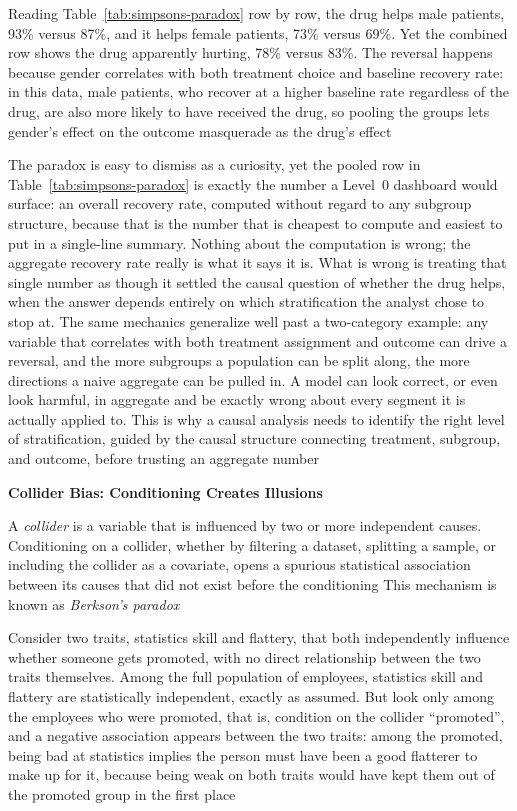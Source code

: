 Reading Table~\ref{tab:simpsons-paradox} row by row, the drug helps male
patients, 93\% versus 87\%, and it helps female patients, 73\% versus 69\%. Yet
the combined row shows the drug apparently hurting, 78\% versus 83\%. The
reversal happens because gender correlates with both treatment choice and
baseline recovery rate: in this data, male patients, who recover at a higher baseline
rate regardless of the drug, are also more likely to have received the drug, so pooling
the groups lets gender's effect on the outcome masquerade as the drug's effect

The paradox is easy to dismiss as a curiosity, yet the pooled row in Table~\ref{tab:simpsons-paradox}
is exactly the number a Level~0 dashboard would surface: an overall recovery
rate, computed without regard to any subgroup structure, because that is the
number that is cheapest to compute and easiest to put in a single-line summary. Nothing
about the computation is wrong; the aggregate recovery rate really is what it
says it is. What is wrong is treating that single number as though it settled the
causal question of whether the drug helps, when the answer depends entirely on
which stratification the analyst chose to stop at. The same mechanics generalize
well past a two-category example: any variable that correlates with both
treatment assignment and outcome can drive a reversal, and the more subgroups a population
can be split along, the more directions a naive aggregate can be pulled in. A model
can look correct, or even look harmful, in aggregate and be exactly wrong about every
segment it is actually applied to. This is why a causal analysis needs to
identify the right level of stratification, guided by the causal structure connecting
treatment, subgroup, and outcome, before trusting an aggregate number

\textbf{Collider Bias: Conditioning Creates Illusions}

\begin{definition}
  A \emph{collider} is a variable that is influenced by two or more independent
  causes. Conditioning on a collider, whether by filtering a dataset, splitting a
  sample, or including the collider as a covariate, opens a spurious statistical
  association between its causes that did not exist before the conditioning This
  mechanism is known as \emph{Berkson's paradox}
\end{definition}

Consider two traits, statistics skill and flattery, that both independently
influence whether someone gets promoted, with no direct relationship between the
two traits themselves. Among the full population of employees, statistics skill and
flattery are statistically independent, exactly as assumed. But look only among the
employees who were promoted, that is, condition on the collider ``promoted'',
and a negative association appears between the two traits: among the promoted,
being bad at statistics implies the person must have been a good flatterer to
make up for it, because being weak on both traits would have kept them out of the
promoted group in the first place

